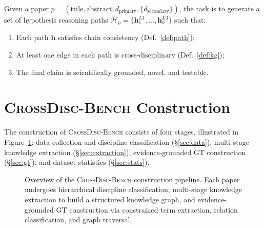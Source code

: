 \documentclass{article}
\newcommand{\ours}{\textsc{CrossDisc-Bench}}
\begin{document}
\begin{definition}
\label{def:task}
Given a paper $p = (\text{title}, \text{abstract}, d_{\text{primary}}, \{d_{\text{secondary}}\})$, the task is to generate a set of hypothesis reasoning paths $\mathcal{H}_p = \{\mathbf{h}_1^{L1}, \ldots, \mathbf{h}_k^{L3}\}$ such that:
\begin{enumerate}[leftmargin=*,topsep=1pt,itemsep=0pt]
\item Each path $\mathbf{h}$ satisfies chain consistency (Def.~\ref{def:path});
\item At least one edge in each path is cross-disciplinary (Def.~\ref{def:kg});
\item The final claim is scientifically grounded, novel, and testable.
\end{enumerate}
\end{definition}

\section{\ours{} Construction}
\label{sec:construction}

The construction of \ours{} consists of four stages, illustrated in Figure~\ref{fig:pipeline}: data collection and discipline classification (\S\ref{sec:data}), multi-stage knowledge extraction (\S\ref{sec:extraction}), evidence-grounded GT construction (\S\ref{sec:gt}), and dataset statistics (\S\ref{sec:stats}).

\begin{figure}[t]
\centering
{}
\caption{Overview of the \ours{} construction pipeline. Each paper undergoes hierarchical discipline classification, multi-stage knowledge extraction to build a structured knowledge graph, and evidence-grounded GT construction via constrained term extraction, relation classification, and graph traversal.}
\label{fig:pipeline}
\end{figure}
\end{document}
